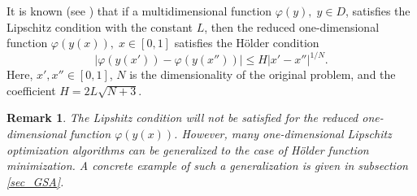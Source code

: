 \documentclass[iicol]{sn-jnl}
\theoremstyle{thmstyleone}%
\theoremstyle{thmstyletwo}%
\newtheorem{remark}{Remark}%
\theoremstyle{thmstylethree}%
\begin{document}
It is known (see \citet{Strongin2000}) that if a multidimensional function  $\varphi(y), \; y \in D$,  satisfies the Lipschitz condition with the constant $L$, then the reduced one-dimensional function $\varphi(y(x)), \; x \in [0,1]$ satisfies the H{\"o}lder condition
\begin{equation}\label{holder}
\left|\varphi(y(x'))-\varphi(y(x''))\right|\leq H\left|x'-x''\right|^{1/N}.
\end{equation}
Here, $x',x''\in[0,1]$, $N$ is the dimensionality of the original problem, and the coefficient
$ H=2 L \sqrt{N+3}$.

\begin{remark}
The Lipshitz condition will not be satisfied for the reduced one-dimensional function $\varphi(y(x))$. However, many one-dimensional Lipschitz optimization algorithms can be generalized to the case of H{\"o}lder function minimization. A concrete example of such a generalization is given in subsection \ref{sec_GSA}.


\end{remark}
\end{document}

